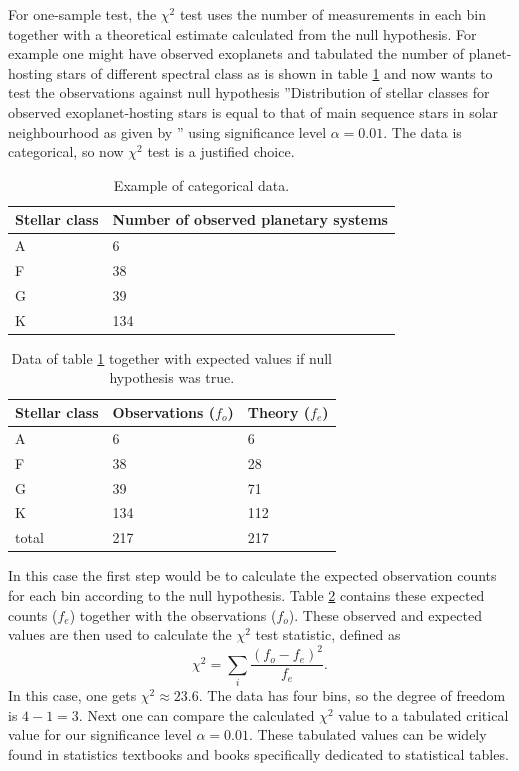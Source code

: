 \documentclass[english, oneside]{HYgradu}
\begin{document}
For one-sample test, the $\chi^2$ test uses the number of measurements in each bin together with a theoretical estimate calculated from the null hypothesis. For example one might have observed exoplanets and tabulated the number of planet-hosting stars of different spectral class as is shown in table \ref{tab:exoplanets} and now wants 
to test the observations against null hypothesis ''Distribution of stellar classes for observed exoplanet-hosting stars is equal to that of main sequence stars in solar neighbourhood as given by \citet{ledrew2001real}'' using significance level $\alpha=0.01$. The data is categorical, so now $\chi^2$ test is a justified choice. \citep{corder2014nonparametric}

\begin{table}
	\centering
	\begin{tabular}{p{2cm}|p{4cm}}
		Stellar class & Number of observed planetary systems \\ \hline
		A & 6 \\
		F & 38 \\
		G & 39 \\
		K & 134
	\end{tabular}
	\caption{Example of categorical data.}
	\label{tab:exoplanets}
\end{table}

\begin{table}
	\centering
	\begin{tabular}{ l | l | l }
		Stellar class & Observations ($f_o$)& Theory ($f_e$) \\ \hline
		A & 6 & 6 \\
		F & 38 & 28 \\
		G & 39 & 71 \\
		K & 134 & 112 \\ \hline
		total & 217 & 217
	\end{tabular}
	\caption{Data of table \ref{tab:exoplanets} together with expected values if null hypothesis was true.}
	\label{tab:exoplanets-null}
\end{table}

In this case the first step would be to calculate the expected observation counts for each bin according to the null hypothesis. Table \ref{tab:exoplanets-null} contains these expected counts ($f_e$) together with the observations ($f_o$). These observed and expected values are then used to calculate the $\chi^2$ test statistic, defined as
\begin{equation}
	\chi^2 = \sum_i \frac{(f_o - f_e)^2}{f_e}.
\end{equation}
\reversemarginpar
{}
In this case, one gets $\chi^2 \approx 23.6$. The data has four bins, so the degree of freedom is $4-1=3$. Next one can compare the calculated $\chi^2$ value to a tabulated critical value for our significance level $\alpha=0.01$. These tabulated values can be widely found in statistics textbooks and books specifically dedicated to statistical tables. \citep{corder2014nonparametric}
\end{document}
